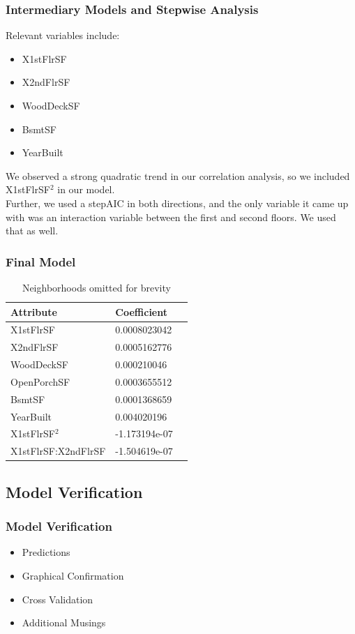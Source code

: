 \documentclass{beamer}
\begin{document}
\begin{frame}
\frametitle{Intermediary Models and Stepwise Analysis}
Relevant variables include:
\begin{itemize}
\item X1stFlrSF
\item X2ndFlrSF
\item WoodDeckSF
\item BsmtSF
\item YearBuilt
\end{itemize}
We observed a strong quadratic trend in our correlation analysis, so we included X1stFlrSF$^2$ in our model.\\
Further, we used a stepAIC in both directions, and the only variable it came up with was an interaction variable between the first and second floors. We used that as well.
\end{frame}


\begin{frame}
\frametitle{Final Model}
\begin{table}
\begin{tabular}{l l l}
\toprule
\textbf{Attribute} & \textbf{Coefficient}\\
\midrule
 X1stFlrSF           &  0.0008023042 \\
 X2ndFlrSF           &  0.0005162776 \\
 WoodDeckSF          &   0.000210046 \\
 OpenPorchSF         &  0.0003655512 \\
 BsmtSF              &  0.0001368659 \\
 YearBuilt           &   0.004020196 \\
 X1stFlrSF$^2$         & -1.173194e-07 \\
 X1stFlrSF:X2ndFlrSF & -1.504619e-07 \\
\bottomrule
\end{tabular}
\caption{Neighborhoods omitted for brevity}
\end{table}
\end{frame}



\begin{frame}
\section{Model Verification}
\frametitle{Model Verification}
\begin{itemize}
  \item Predictions
\item Graphical Confirmation
\item Cross Validation
\item Additional Musings
\end{itemize}
\end{frame}
\end{document}

